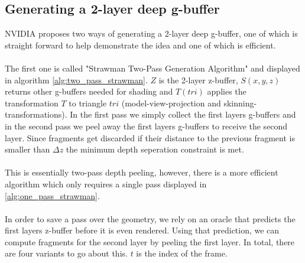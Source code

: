 \documentclass{ACGSeminar}
\begin{document}
	\subsection{Generating a 2-layer deep g-buffer}
		NVIDIA proposes two ways of generating a 2-layer deep g-buffer, one of which is straight forward to help demonstrate the idea and one of which is efficient. \\\\
		The first one is called "Strawman Two-Pass Generation Algorithm" and displayed in algorithm \ref{alg:two_pass_strawman}. $Z$ is the 2-layer z-buffer, $S(x, y, z)$ returns other g-buffers needed for shading and $T(tri)$ applies the transformation $T$ to triangle $tri$ (model-view-projection and skinning-transformations). In the first pass we simply collect the first layers g-buffers and in the second pass we peel away the first layers g-buffers to receive the second layer. Since fragments get discarded if their distance to the previous fragment is smaller than $\Delta z$ the minimum depth seperation constraint is met. \\\\
		This is essentially two-pass depth peeling, however, there is a more efficient algorithm which only requires a single pass displayed in \ref{alg:one_pass_strawman}. \\\\
		In order to save a pass over the geometry, we rely on an oracle that predicts the first layers z-buffer before it is even rendered. Using that prediction, we can compute fragments for the second layer by peeling the first layer. In total, there are four variants to go about this. $t$ is the index of the frame.
\end{document}
